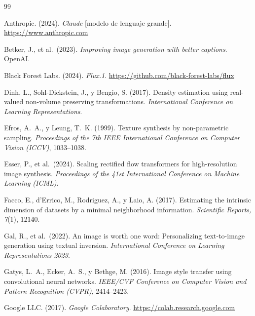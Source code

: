 \documentclass[12pt, a4paper, twoside]{book}
\begin{document}
\renewcommand{\bibname}{Referencias bibliográficas}
\begin{thebibliography}{99}

Anthropic. (2024).
\textit{Claude} [modelo de lenguaje grande].
\url{https://www.anthropic.com}

Betker, J., et al.\ (2023).
\textit{Improving image generation with better captions}.
OpenAI.

Black Forest Labs. (2024).
\textit{Flux.1}.
\url{https://github.com/black-forest-labs/flux}

Dinh, L., Sohl-Dickstein, J., y Bengio, S. (2017).
Density estimation using real-valued non-volume preserving transformations.
\textit{International Conference on Learning Representations}.

Efros, A.~A., y Leung, T.~K. (1999).
Texture synthesis by non-parametric sampling.
\textit{Proceedings of the 7th IEEE International Conference on Computer Vision (ICCV)}, 1033--1038.

Esser, P., et al.\ (2024).
Scaling rectified flow transformers for high-resolution image synthesis.
\textit{Proceedings of the 41st International Conference on Machine Learning (ICML)}.

Facco, E., d'Errico, M., Rodriguez, A., y Laio, A. (2017).
Estimating the intrinsic dimension of datasets by a minimal neighborhood information.
\textit{Scientific Reports, 7}(1), 12140.

Gal, R., et al.\ (2022).
An image is worth one word: Personalizing text-to-image generation using textual inversion.
\textit{International Conference on Learning Representations 2023}.

Gatys, L.~A., Ecker, A.~S., y Bethge, M. (2016).
Image style transfer using convolutional neural networks.
\textit{IEEE/CVF Conference on Computer Vision and Pattern Recognition (CVPR)}, 2414--2423.

Google LLC. (2017).
\textit{Google Colaboratory}.
\url{https://colab.research.google.com}


\end{thebibliography}
\end{document}
